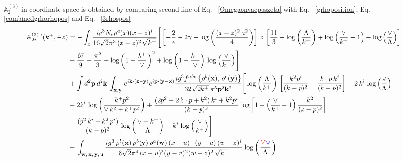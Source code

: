 \documentclass[aps,prd,amsmath,amssymb,nofootinbib]{revtex4-2}
\def\mf#1{\mathbb{#1}}
\def\v#1{\mathbf{#1}}
\numberwithin{equation}{section}
\begin{document}
$ \mf{A}^{(3)}_{2}$ in coordinate space is obtained by comparing second line of Eq.~ \eqref{Omegaonvacposzeta} with Eq.~ \eqref{grhoposition}, Eq.~ \eqref{combinedgrhorhopos} and Eq.~ \eqref{3rhospos}
\begin{align}
   \mf{A}^{(3)\,a}_{2i}(k^{+},-z)  & =  -\int_{x} \frac{ig^{3}N_{c}\rho^{a}(x)(x-z)^{i}}{16\sqrt{2}\pi^{3}\,(x-z)^{2}\,\sqrt{k^{+}}}\Bigg[\left[-\frac{2}{\epsilon}-2\gamma -\log{\left(\frac{(x-z)^{2}\,\mu^{2}}{4}\right)}\right]\times \left[\frac{11}{3}+ \log{\left(\frac{\Lambda}{k^{+}}\right)}+\log{\left(\frac{\vee}{k^{+}}-1\right)}-\log{\left(\frac{\vee}{\Lambda}\right)}\right]\notag \\ & -\frac{67}{9}+\frac{\pi^{2}}{3} + \log{\left(1-\frac{k^{+}}{\vee}\right)}^{2}+\log{\left(1-\frac{k^{+}}{\vee}\right)}\,\log{\left(\frac{\vee}{k^{+}}\right)}\Bigg] \notag \\ & +\int d^{2}\mathbf{p}\,d^{2}\mathbf{k}\,\int_{\v{x},\v{y}}\, e^{i\v{k}\cdot (\v{z}-\v{y})} e^{i\v{p}\cdot (\v{y}-\v{x})}\frac{ig^{3}f^{abc}\left\{ \rho^{b}(\mathbf{x}),\,\rho^{c}(\mathbf{y})\right\}}{32\sqrt{2k^{+}}\,\pi^{5}\mathbf{p}^{2}\mathbf{k}^{2}}\Bigg[\log{\left(\frac{\Lambda}{k^{+}}\right)}\,\left[\frac{k^{2}p^{i}}{(k-p)^{2}}-\frac{k\cdot p\,k^{i}}{(k-p)^{2}}\right]-2\,k^{i}\,\log{\left(\frac{\vee}{\Lambda}\right)}\notag \\ & -2k^{i}\,\log{\left(\frac{k^{+}p^{2}}{\vee\, k^{2}+k^{+}p^{2}}\right)}+\frac{(2p^{2}-2\,k\cdot p + k^{2})\,k^{i} + k^{2}p^{i}}{(k-p)^{2}}\, \log{\left[1+\left(\frac{\vee}{k^{+}}-1\right)\frac{k^{2}}{(k-p)^{2}}\right]}\notag \\ & - \frac{(p^{2}\,k^{i}+k^{2}\,p^{i})}{(k-p)^{2}}\, \log{\left(\frac{\vee - k^{+}}{\Lambda}\right)}-k^{i}\, \log{\left(\frac{\vee}{k^{+}}\right)}\Bigg]\notag \\ & -\,\int_{\mathbf{w},\, \mathbf{x},\, \mathbf{y},\, \mathbf{u}}\frac{ig^{3}\,\rho^{b}(\mathbf{x})\,\rho^{b}(\mathbf{y})\,\rho^{a}(\mathbf{w})\, (x-u)\cdot (y-u)\,(w-z)^{i}}{8\sqrt{2}\pi^{4}\,(x-u)^{2}(y-u)^{2}(w-z)^{2}\,\sqrt{k^{+}}}\,\log{\left(\frac{\textcolor{red}{V}\textcolor{blue}{\vee}}{\Lambda}\right)} %
\end{align}
\end{document}
